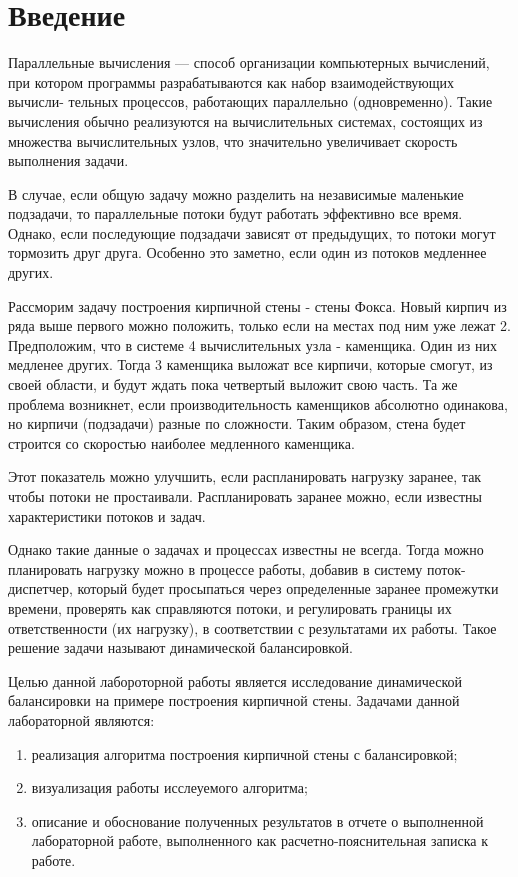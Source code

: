 \chapter*{Введение}\label{Input}


Параллельные вычисления — способ организации компьютерных вычислений,
при котором программы разрабатываются как набор взаимодействующих вычисли-
тельных процессов, работающих параллельно (одновременно).
Такие вычисления обычно реализуются на вычислительных системах, состоящих из множества вычислительных узлов, что 
значительно увеличивает скорость выполнения задачи.  \cite{paral}

В случае, если общую задачу можно разделить на независимые маленькие подзадачи, то параллельные потоки будут работать эффективно 
все время. Однако, если последующие подзадачи зависят от предыдущих, то потоки могут тормозить друг друга. Особенно это заметно, если
один из потоков медленнее других.

Рассморим задачу построения кирпичной стены - стены Фокса. Новый кирпич из ряда выше первого можно положить, только если на местах 
под ним уже лежат 2. Предположим, что в системе 4 вычислительных узла - каменщика. Один из них медленее других. Тогда 3 каменщика 
выложат все кирпичи, которые смогут, из своей области, и будут ждать пока четвертый выложит свою часть. Та же проблема возникнет, 
если производительность каменщиков абсолютно одинакова, но кирпичи (подзадачи) разные по сложности.  Таким образом, стена будет 
строится со скоростью наиболее медленного каменщика. 

Этот показатель можно улучшить, если распланировать нагрузку заранее, так чтобы потоки не простаивали. Распланировать заранее можно,
если известны характеристики потоков и задач.

Однако такие данные о задачах и процессах известны не всегда. Тогда можно планировать нагрузку можно в процессе работы, добавив в 
систему поток-диспетчер, который будет просыпаться через определенные заранее промежутки времени, проверять как справляются потоки,
и регулировать границы их ответственности (их нагрузку), в соответствии с результатами их работы. Такое решение задачи называют 
динамической балансировкой. \cite{res}

Целью данной лабороторной работы является исследование динамической балансировки на примере построения кирпичной стены. Задачами 
данной лабораторной являются:

\begin{enumerate}
  \item реализация алгоритма построения кирпичной стены с балансировкой;
  \item визуализация работы исслеуемого алгоритма;
  \item описание и обоснование полученных результатов в отчете о выполненной лабораторной работе, выполненного как расчетно-пояснительная 
  записка к работе.
\end{enumerate}

